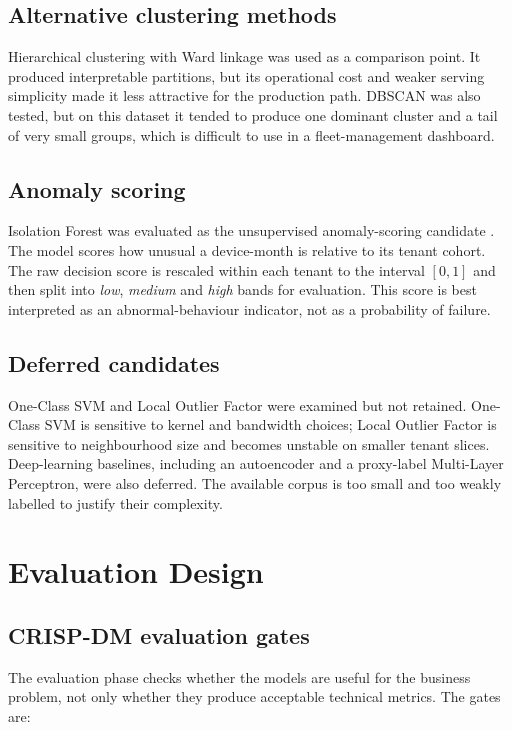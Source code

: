 \subsection{Alternative clustering methods}
Hierarchical clustering with Ward linkage was used as a comparison point. It produced interpretable partitions, but its operational cost and weaker serving simplicity made it less attractive for the production path. DBSCAN was also tested, but on this dataset it tended to produce one dominant cluster and a tail of very small groups, which is difficult to use in a fleet-management dashboard.

\subsection{Anomaly scoring}
Isolation Forest was evaluated as the unsupervised anomaly-scoring candidate \cite{liu2008isolation}. The model scores how unusual a device-month is relative to its tenant cohort. The raw decision score is rescaled within each tenant to the interval $[0,1]$ and then split into \emph{low}, \emph{medium} and \emph{high} bands for evaluation. This score is best interpreted as an abnormal-behaviour indicator, not as a probability of failure.

\subsection{Deferred candidates}
One-Class SVM and Local Outlier Factor were examined but not retained. One-Class SVM is sensitive to kernel and bandwidth choices; Local Outlier Factor is sensitive to neighbourhood size and becomes unstable on smaller tenant slices. Deep-learning baselines, including an autoencoder and a proxy-label Multi-Layer Perceptron, were also deferred. The available corpus is too small and too weakly labelled to justify their complexity.

\section{Evaluation Design}

\subsection{CRISP-DM evaluation gates}
The evaluation phase checks whether the models are useful for the business problem, not only whether they produce acceptable technical metrics. The gates are:

